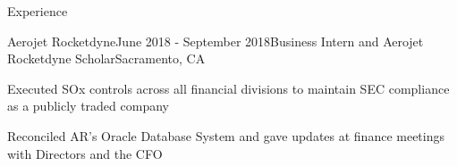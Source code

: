 \documentclass{resume} %
\newcommand{\tab}[1]{\hspace{.2667\textwidth}\rlap{#1}}
\newcommand{\itab}[1]{\hspace{0em}\rlap{#1}}
\begin{document}
\begin{rSection}{\faCode{ }}{Experience}
\iffalse
\begin{rSubsection}{}{University of California, San Diego}{June 2019 - Present}{Research Assistant}{La Jolla, CA}
\item Wrangling data using Tabula and cleaning data using pandas Python library
\item Assisting graduate student Alyssa Brown to publish a thesis focusing on the impact of school lunch programs
\end{rSubsection}


\begin{rSubsection}{}{REPS \& Company}{September 2018 - November 2018}{Market Analyst Intern}{San Diego, CA}
\item Implemented data analysis to manage an individual portfolio with >13\% returns
\item Facilitated ticket brokerage and performed market analysis for pricing and purchasing stock in live events
\end{rSubsection}

\fi


\begin{rSubsection}{}{Aerojet Rocketdyne}{June 2018 - September 2018}{Business Intern and Aerojet Rocketdyne Scholar}{Sacramento, CA}
\item Executed SOx controls across all financial divisions to maintain SEC compliance as a publicly traded company
\item Reconciled AR's Oracle Database System and gave updates at finance meetings with Directors and the CFO
\end{rSubsection}
\end{rSection}

\iffalse
\begin{rSection}{}{Relevant Coursework}
\itab{Algorithm \& Systems Analysis} \tab{}  \tab{Computer Organization \& Systems Programs} 
\\ \itab{Data Structures \& OO Design} \tab{}  \tab{Financial \& Managerial Accounting} 
\\ \itab{Udemy coursework in HTML/CSS for Web Design} \tab{} \tab{Udemy coursework in Python for Financial Analysis}
\end{rSection}
\fi
\end{document}

